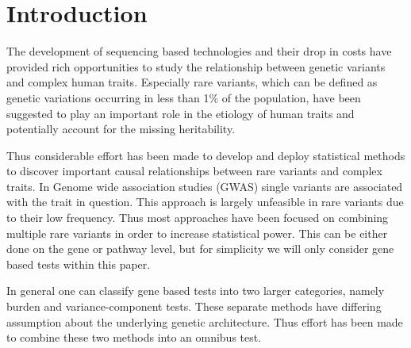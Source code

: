 \section{Introduction}
\label{sec:introduction}

The development of sequencing based technologies and their drop in costs have provided rich opportunities to study the relationship between genetic variants and complex human traits\cite{Goodwin2016}.
Especially rare variants, which can be defined as genetic variations occurring in less than 1\% of the population, have been suggested to play an important role in the etiology of human traits and potentially account for the missing heritability\cite{Jiang2013,Li2009a}. 

Thus considerable effort has been made to develop and deploy statistical methods to discover important causal relationships between rare variants and complex traits\cite{Morris2010,Zeng2014,Daye2012,Manuscript2013}.
In Genome wide association studies (GWAS) single variants are associated with the trait in question.
This approach is largely unfeasible in rare variants due to their low frequency\cite{Lee2014}.
Thus most approaches have been focused on combining multiple rare variants in order to increase statistical power.
This can be either done on the gene or pathway level, but for simplicity we will only consider gene based tests within this paper.

In general one can classify gene based tests into two larger categories, namely burden and variance-component tests\cite{Lee2014}.
These separate methods have differing assumption about the underlying genetic architecture.
Thus effort has been made to combine these two methods into an omnibus test.

